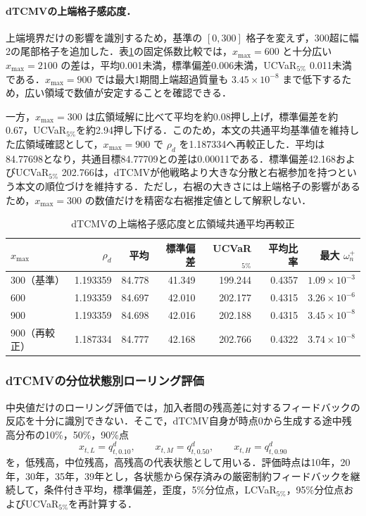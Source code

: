 \documentclass[10pt,a4paper]{article}
\theoremstyle{plain}
\theoremstyle{definition}
\begin{document}
\paragraph{dTCMVの上端格子感応度．}
上端境界だけの影響を識別するため，基準の $[0,300]$ 格子を変えず，300超に幅2の尾部格子を追加した．表\ref{tab:xmax-sensitivity-D0}の固定係数比較では，$x_{\max}=600$ と十分広い $x_{\max}=2100$ の差は，平均0.001未満，標準偏差0.006未満，UCVaR$_{5\%}$ 0.011未満である．$x_{\max}=900$ では最大1期間上端超過質量も $3.45\times10^{-8}$ まで低下するため，広い領域で数値が安定することを確認できる．

一方，$x_{\max}=300$ は広領域解に比べて平均を約0.08押し上げ，標準偏差を約0.67，UCVaR$_{5\%}$を約2.94押し下げる．このため，本文の共通平均基準値を維持した広領域確認として，$x_{\max}=900$ で $\rho_d$ を1.187334へ再較正した．平均は84.77698となり，共通目標84.77709との差は0.00011である．標準偏差42.168およびUCVaR$_{5\%}$ 202.766は，dTCMVが他戦略より大きな分散と右裾参加を持つという本文の順位づけを維持する．ただし，右裾の大きさには上端格子の影響があるため，$x_{\max}=300$ の数値だけを精密な右裾推定値として解釈しない．

\begin{table}[H]
\centering
\small
\caption{dTCMVの上端格子感応度と広領域共通平均再較正}
\label{tab:xmax-sensitivity-D0}
\begin{tabular}{lrrrrrr}
\toprule
$x_{\max}$ & $\rho_d$ & 平均 & 標準偏差 & UCVaR$_{5\%}$ & 平均比率 & 最大 $\omega_n^+$ \\
\midrule
300（基準） & 1.193359 & 84.778 & 41.349 & 199.244 & 0.4357 & $1.09\times10^{-3}$ \\
600          & 1.193359 & 84.697 & 42.010 & 202.177 & 0.4315 & $3.26\times10^{-6}$ \\
900          & 1.193359 & 84.698 & 42.016 & 202.188 & 0.4315 & $3.45\times10^{-8}$ \\
900（再較正） & 1.187334 & 84.777 & 42.168 & 202.766 & 0.4322 & $3.74\times10^{-8}$ \\
\bottomrule
\end{tabular}
\end{table}

\subsubsection{dTCMVの分位状態別ローリング評価}
\label{sec:dtcmv-rolling-quantiles}

中央値だけのローリング評価では，加入者間の残高差に対するフィードバックの反応を十分に識別できない．そこで，dTCMV自身が時点0から生成する途中残高分布の10\%，50\%，90\%点
\[
  x_{t,L}=q_{t,0.10}^{d},\qquad
  x_{t,M}=q_{t,0.50}^{d},\qquad
  x_{t,H}=q_{t,0.90}^{d}
\]
を，低残高，中位残高，高残高の代表状態として用いる．評価時点は10年，20年，30年，35年，39年とし，各状態から保存済みの厳密制約フィードバックを継続して，条件付き平均，標準偏差，歪度，5\%分位点，LCVaR$_{5\%}$，95\%分位点およびUCVaR$_{5\%}$を再計算する．
\end{document}
